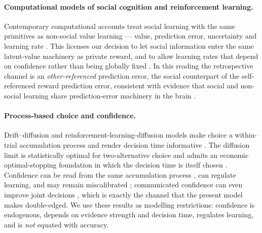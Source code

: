 \documentclass[11pt]{article}
\newcommand{\1}{\mathbf{1}}
\begin{document}
\paragraph{Computational models of social cognition and reinforcement learning.}
Contemporary computational accounts treat social learning with the same
primitives as non-social value learning --- value, prediction error,
uncertainty and learning rate
\citep{RuffFehr2014,LockwoodKleinFlugge2021}. This licenses our decision to let
social information enter the same latent-value machinery as private reward, and
to allow learning rates that depend on confidence rather than being globally
fixed \citep{WangVeismannBanerjeePleger2023}. In this reading the retrospective
channel is an \emph{other-referenced} prediction error, the social counterpart of
the self-referenced reward prediction error, consistent with evidence that social
and non-social learning share prediction-error machinery in the brain
\citep{JoinerPivaTurrinChang2017}.

\paragraph{Process-based choice and confidence.}
Drift--diffusion and reinforcement-learning-diffusion models make choice a
within-trial accumulation process and render decision time informative
\citep{Ratcliff1978,RatcliffSmithBrownMcKoon2016,PedersenFrankBiele2017,FontanesiGluthSpektorRieskamp2019}.
The diffusion limit is statistically optimal for two-alternative choice
\citep{BogaczBrownMoehlisHolmesCohen2006} and admits an economic optimal-stopping
foundation in which the decision time is itself chosen
\citep{FudenbergStrackStrzalecki2018}. Confidence can be read from the same
accumulation process \citep{KianiShadlen2009,PleskacBusemeyer2010,Drugowitsch2019},
can regulate learning, and may remain miscalibrated
\citep{SalemGarciaPalminteriLebreton2023}; communicated confidence can even
improve joint decisions \citep{BahramiOlsenLathamRoepstorffReesFrith2010}, which
is exactly the channel that the present model makes double-edged. We use these
results as modelling restrictions: confidence is endogenous, depends on evidence
strength and decision time, regulates learning, and is \emph{not} equated with
accuracy.
\end{document}
